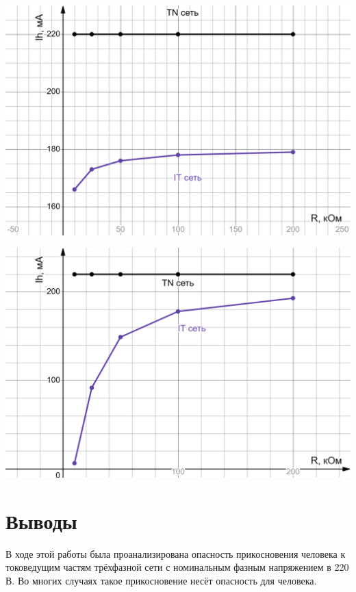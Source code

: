 	\noindent
	\begin{minipage}{.5\textwidth}
		\includegraphics[width=\textwidth]{png/i(r).png}
		\label{i(r)}
	\end{minipage}
	\begin{minipage}{.5\textwidth}
		\includegraphics[width=\textwidth]{png/i(c).png}
		\label{i(c)}
	\end{minipage}

	\newpage

	\section{Выводы}
	
	В ходе этой работы была проанализирована опасность прикосновения человека к токоведущим частям трёхфазной сети с номинальным фазным напряжением в 220\,В. Во многих случаях такое прикосновение несёт опасность для человека. 
	

